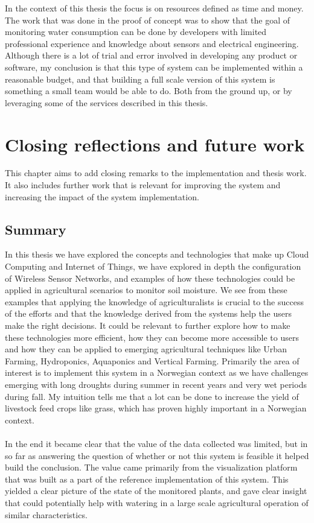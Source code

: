 \documentclass[]{uiophd}
\begin{document}
In the context of this thesis the focus is on resources defined as time and money. The work that was done in the proof of concept was to show that the goal of monitoring water consumption can be done by developers with limited professional experience and knowledge about sensors and electrical engineering. Although there is a lot of trial and error involved in developing any product or software, my conclusion is that this type of system can be implemented within a reasonable budget, and that building a full scale version of this system is something a small team would be able to do. Both from the ground up, or by leveraging some of the services described in this thesis.


\chapter{Closing reflections and future work}

This chapter aims to add closing remarks to the implementation and thesis work. It also includes further work that is relevant for improving the system and increasing the impact of the system implementation.

\section{Summary}
In this thesis we have explored the concepts and technologies that make up Cloud Computing and Internet of Things, we have explored in depth the configuration of Wireless Sensor Networks, and examples of how these technologies could be applied in agricultural scenarios to monitor soil moisture. We see from these examples that applying the knowledge of agriculturalists is crucial to the success of the efforts and that the knowledge derived from the systems help the users make the right decisions. It could be relevant to further explore how to make these technologies more efficient, how they can become more accessible to users and how they can be applied to emerging agricultural techniques like Urban Farming, Hydroponics, Aquaponics and Vertical Farming. Primarily the area of interest is to implement this system in a Norwegian context as we have challenges emerging with long droughts during summer in recent years and very wet periods during fall. My intuition tells me that a lot can be done to increase the yield of livestock feed crops like grass, which has proven highly important in a Norwegian context.
\\\\
In the end it became clear that the value of the data collected was limited, but in so far as answering the question of whether or not this system is feasible it helped build the conclusion. The value came primarily from the visualization platform that was built as a part of the reference implementation of this system. This yielded a clear picture of the state of the monitored plants, and gave clear insight that could potentially help with watering in a large scale agricultural operation of similar characteristics.
\end{document}
